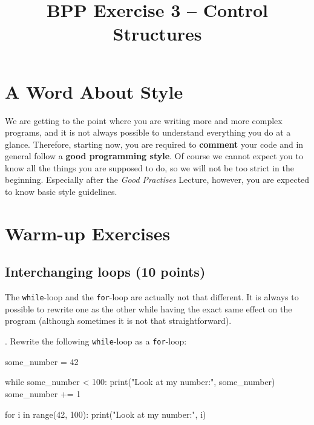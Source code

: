 


\title{BPP Exercise 3 -- Control Structures}




\section*{A Word About Style}

We are getting to the point where you are writing more and more complex programs, and it is not always possible to understand everything you do at a glance. Therefore, starting now, you are required to \textbf{comment} your code and in general follow a \textbf{good programming style}. Of course we cannot expect you to know all the things you are supposed to do, so we will not be too strict in the beginning. Especially after the \textit{Good Practises} Lecture, however, you are expected to know basic style guidelines.

\section{Warm-up Exercises}

\subsection{Interchanging loops (10 points)}

The \texttt{while}-loop and the \texttt{for}-loop are actually not that different. It is always to possible to rewrite one as the other while having the exact same effect on the program (although sometimes it is not that straightforward).

\vspace{1em}

. Rewrite the following \texttt{while}-loop as a \texttt{for}-loop:

\begin{pythoncode}
some_number = 42

while some_number < 100:
    print("Look at my number:", some_number)
    some_number += 1
\end{pythoncode}

\begin{solution}
    \begin{pythoncode}
for i in range(42, 100):
    print("Look at my number:", i)
    \end{pythoncode}
\end{solution}

